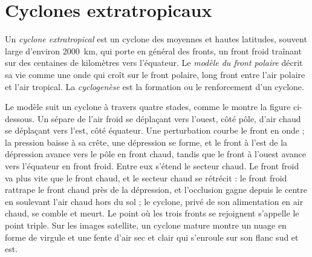 \section{Cyclones extratropicaux}\label{sec:b2:weather-systems:cyclones}

\begin{definition}\label{def:b2:weather-systems:cyclones}
Un \emph{cyclone extratropical} est un cyclone des moyennes et hautes
latitudes, souvent large d'environ \qty{2000}{km}, qui porte en général des fronts, un front froid traînant
sur des centaines de kilomètres vers l'équateur. Le \emph{modèle du front polaire}
décrit sa vie comme une onde qui croît sur le front polaire, long front entre l'air polaire
et l'air tropical. La \emph{cyclogenèse} est la formation ou le renforcement
d'un cyclone.
\end{definition}

Le modèle suit un cyclone à travers quatre stades, comme le montre la figure ci-dessous. Un 
sépare de l'air froid se déplaçant vers l'ouest, côté pôle, d'air chaud se déplaçant vers l'est, côté équateur.
Une perturbation courbe le front en onde ; la pression baisse à sa crête, une dépression se forme, et le front
à l'est de la dépression avance vers le pôle en front chaud, tandis que le front à l'ouest avance vers l'équateur
en front froid. Entre eux s'étend le secteur chaud. Le front froid va plus vite que le front chaud, et le secteur
chaud se rétrécit : le front froid rattrape le front chaud près de la dépression, et l'occlusion gagne depuis le centre
en soulevant l'air chaud hors du sol ; le cyclone, privé de son alimentation en air chaud, se comble et meurt.
Le point où les trois fronts se rejoignent s'appelle le point triple. Sur les images satellite, un cyclone mature
montre un nuage en forme de virgule
et une fente d'air sec et clair qui s'enroule sur son flanc sud et est.

